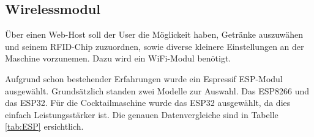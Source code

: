 \subsection{Wirelessmodul}
\label{subsec:Wirelessmodul}

Über einen Web-Host soll der User die Möglickeit haben, Getränke auszuwähen und seinem RFID-Chip zuzuordnen, sowie diverse kleinere Einstellungen an der Maschine vorzunemen. Dazu wird ein WiFi-Modul benötigt.

Aufgrund schon bestehender Erfahrungen wurde ein Espressif ESP-Modul ausgewählt. Grundsätzlich standen zwei Modelle zur Auswahl. Das ESP8266 und das ESP32. Für die Cocktailmaschine wurde das ESP32 ausgewählt, da dies einfach Leistungsstärker ist. Die genauen Datenvergleiche sind in Tabelle \ref{tab:ESP} ersichtlich.

